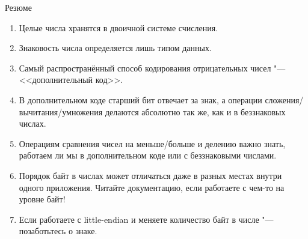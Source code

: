 \begin{frame}{Резюме}
	\begin{enumerate}
		\item
			Целые числа хранятся в двоичной системе счисления.
		\item
			Знаковость числа определяется лишь типом данных.
		\item
			Самый распространённый способ кодирования отрицательных чисел "--- <<дополнительный код>>.
		\item
			В дополнительном коде старший бит отвечает за знак, а операции сложения/вычитания/умножения делаются абсолютно так же, как и в беззнаковых числах.
		\item
			Операциям сравнения чисел на меньше/больше и делению важно знать, работаем ли мы в дополнительном коде или с беззнаковыми числами.
		\item
			Порядок байт в числах может отличаться даже в разных местах внутри одного приложения.
			Читайте документацию, если работаете с чем-то на уровне байт!
		\item
			Если работаете с little-endian и меняете количество байт в числе "--- позаботьтесь о знаке.
	\end{enumerate}
\end{frame}
